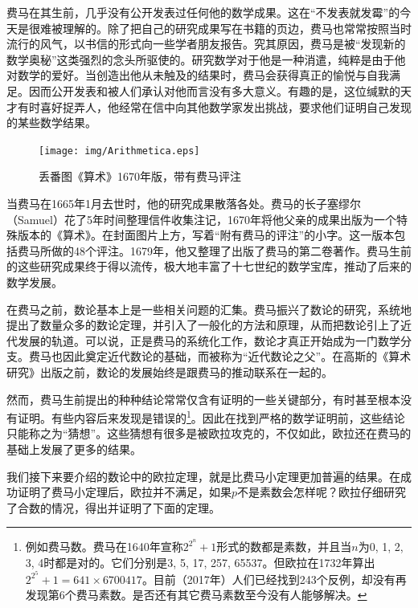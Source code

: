 \documentclass{article}
\begin{document}
费马在其生前，几乎没有公开发表过任何他的数学成果。这在“不发表就发霉”的今天是很难被理解的。除了把自己的研究成果写在书籍的页边，费马也常常按照当时流行的风气，以书信的形式向一些学者朋友报告。究其原因，费马是被“发现新的数学奥秘”这类强烈的念头所驱使的。研究数学对于他是一种消遣，纯粹是由于他对数学的爱好。当创造出他从未触及的结果时，费马会获得真正的愉悦与自我满足。因而公开发表和被人们承认对他而言没有多大意义\cite{HanXueTao2009}。有趣的是，这位缄默的天才有时喜好捉弄人，他经常在信中向其他数学家发出挑战，要求他们证明自己发现的某些数学结果。

\begin{figure}
 \centering
 \texttt{[image: img/Arithmetica.eps]}
 \captionsetup{labelformat=empty}
 \caption{丢番图《算术》1670年版，带有费马评注}
 \label{fig:Arithmetica}
\end{figure}

当费马在1665年1月去世时，他的研究成果散落各处。费马的长子塞缪尔（Samuel）花了5年时间整理信件收集注记，1670年将他父亲的成果出版为一个特殊版本的《算术》。在封面图片上方，写着“附有费马的评注”的小字。这一版本包括费马所做的48个评注。1679年，他又整理了出版了费马的第二卷著作。费马生前的这些研究成果终于得以流传，极大地丰富了十七世纪的数学宝库，推动了后来的数学发展。

在费马之前，数论基本上是一些相关问题的汇集。费马振兴了数论的研究，系统地提出了数量众多的数论定理，并引入了一般化的方法和原理，从而把数论引上了近代发展的轨道。可以说，正是费马的系统化工作，数论才真正开始成为一门数学分支。费马也因此奠定近代数论的基础，而被称为“近代数论之父”。在高斯的《算术研究》出版之前，数论的发展始终是跟费马的推动联系在一起的。

然而，费马生前提出的种种结论常常仅含有证明的一些关键部分，有时甚至根本没有证明。有些内容后来发现是错误的\footnote{例如费马数。费马在1640年宣称$2^{2^n}+1$形式的数都是素数，并且当$n$为0, 1, 2, 3, 4时都是对的。它们分别是3, 5, 17, 257, 65537。但欧拉在1732年算出$2^{2^5} + 1 = 641 \times 6700417$。目前（2017年）人们已经找到243个反例，却没有再发现第6个费马素数。是否还有其它费马素数至今没有人能够解决。}。因此在找到严格的数学证明前，这些结论只能称之为“猜想”。这些猜想有很多是被欧拉攻克的，不仅如此，欧拉还在费马的基础上发展了更多的结果。

我们接下来要介绍的数论中的欧拉定理，就是比费马小定理更加普遍的结果。在成功证明了费马小定理后，欧拉并不满足，如果$p$不是素数会怎样呢？欧拉仔细研究了合数的情况，得出并证明了下面的定理。
\end{document}

